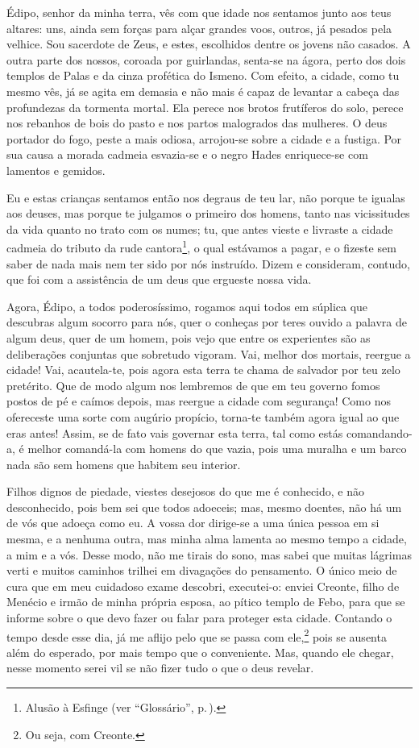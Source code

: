    Édipo, senhor da minha terra, vês com que idade nos sentamos junto aos
teus altares: uns, ainda sem forças para alçar grandes voos, outros, já
pesados pela velhice. Sou sacerdote de Zeus, e estes, escolhidos dentre
os jovens não casados. A outra parte dos nossos, coroada por
guirlandas, senta-se na ágora, perto dos dois templos de Palas e da
cinza profética do Ismeno. Com efeito, a cidade, como tu mesmo vês, já
se agita em demasia e não mais é capaz de levantar a cabeça das
profundezas da tormenta mortal. Ela perece nos brotos frutíferos do
solo, perece nos rebanhos de bois do pasto e nos partos malogrados das
mulheres. O deus portador do fogo, peste a mais odiosa, arrojou-se sobre
a cidade e a fustiga. Por sua causa a morada cadmeia esvazia-se e o
negro Hades enriquece-se com lamentos e gemidos.

 Eu e estas crianças sentamos então nos degraus de teu lar, não
porque te igualas aos deuses, mas porque te julgamos o primeiro dos
homens, tanto nas vicissitudes da vida quanto no trato com os numes; tu,
que antes vieste e livraste a cidade cadmeia do tributo da rude
cantora\footnote{Alusão à Esfinge (ver ``Glossário'', p.\,\pageref{glossario}).}, o qual estávamos a
pagar, e o fizeste sem saber de nada mais nem ter sido por nós
instruído. Dizem e consideram, contudo, que foi com a assistência de um
deus que ergueste nossa vida.

 Agora, Édipo, a todos poderosíssimo, rogamos aqui todos em súplica
que descubras algum socorro para nós, quer o conheças por teres ouvido a
palavra de algum deus, quer de um homem, pois vejo que entre os
experientes são as deliberações conjuntas que sobretudo vigoram. Vai,
melhor dos mortais, reergue a cidade! Vai, acautela-te, pois agora esta
terra te chama de salvador por teu zelo pretérito. Que de modo
algum nos lembremos de que em teu governo fomos postos de pé e caímos
depois, mas reergue a cidade com segurança! Como nos ofereceste uma
sorte com augúrio propício, torna-te também agora igual ao que eras
antes! Assim, se de fato vais governar esta terra, tal como estás
comandando-a, é melhor comandá-la com homens do que vazia, pois uma
muralha e um barco nada são sem homens que habitem seu interior.

   Filhos dignos de piedade, viestes desejosos do que me é conhecido, e não
 desconhecido, pois bem sei que todos adoeceis; mas, mesmo doentes,
não há um de vós que adoeça como eu. A vossa dor dirige-se a uma única
pessoa em si mesma, e a nenhuma outra, mas minha alma lamenta ao mesmo
tempo a cidade, a mim e a vós. Desse modo, não me tirais do sono, mas
sabei que muitas lágrimas verti e muitos caminhos trilhei em divagações
do pensamento. O único meio de cura que em meu cuidadoso exame
descobri, executei-o: enviei Creonte, filho de Menécio e irmão de minha
própria esposa, ao pítico templo de Febo, para que se informe sobre o
que devo fazer ou falar para proteger esta cidade. Contando o tempo
desde esse dia, já me aflijo pelo que se passa com ele,\footnote{Ou seja,
  com Creonte.} pois se ausenta além do esperado, por mais tempo que o
conveniente. Mas, quando ele chegar, nesse momento serei vil se não
fizer tudo o que o deus revelar.

